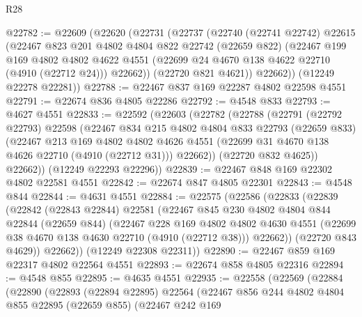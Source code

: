 \begin{lexlean}{R28}
\begin{coremodule}
@22782 := @22609
    (@22620
      (@22731
        (@22737
          (@22740
            (@22741 @22742)
            @22615
            (@22467
              @823
              @201
              @4802
              @4804
              @822
              @22742
              (@22659 @822)
              (@22467
                @199
                @169
                @4802
                @4802
                @4622
                @4551
                (@22699 @24 @4670 @138 @4622 @22710 (@4910 (@22712 @24)))
                @22662))
            (@22720 @821 @4621))
          @22662))
      (@12249 @22278 @22281))
@22788 := @22467 @837 @169 @22287 @4802 @22598 @4551
@22791 := @22674 @836 @4805 @22286
@22792 := @4548 @833
@22793 := @4627 @4551
@22833 := @22592
    (@22603
      (@22782
        (@22788
          (@22791
            (@22792 @22793)
            @22598
            (@22467
              @834
              @215
              @4802
              @4804
              @833
              @22793
              (@22659 @833)
              (@22467
                @213
                @169
                @4802
                @4802
                @4626
                @4551
                (@22699 @31 @4670 @138 @4626 @22710 (@4910 (@22712 @31)))
                @22662))
            (@22720 @832 @4625))
          @22662))
      (@12249 @22293 @22296))
@22839 := @22467 @848 @169 @22302 @4802 @22581 @4551
@22842 := @22674 @847 @4805 @22301
@22843 := @4548 @844
@22844 := @4631 @4551
@22884 := @22575
    (@22586
      (@22833
        (@22839
          (@22842
            (@22843 @22844)
            @22581
            (@22467
              @845
              @230
              @4802
              @4804
              @844
              @22844
              (@22659 @844)
              (@22467
                @228
                @169
                @4802
                @4802
                @4630
                @4551
                (@22699 @38 @4670 @138 @4630 @22710 (@4910 (@22712 @38)))
                @22662))
            (@22720 @843 @4629))
          @22662))
      (@12249 @22308 @22311))
@22890 := @22467 @859 @169 @22317 @4802 @22564 @4551
@22893 := @22674 @858 @4805 @22316
@22894 := @4548 @855
@22895 := @4635 @4551
@22935 := @22558
    (@22569
      (@22884
        (@22890
          (@22893
            (@22894 @22895)
            @22564
            (@22467
              @856
              @244
              @4802
              @4804
              @855
              @22895
              (@22659 @855)
              (@22467
                @242
                @169

\end{coremodule}
\end{lexlean}
